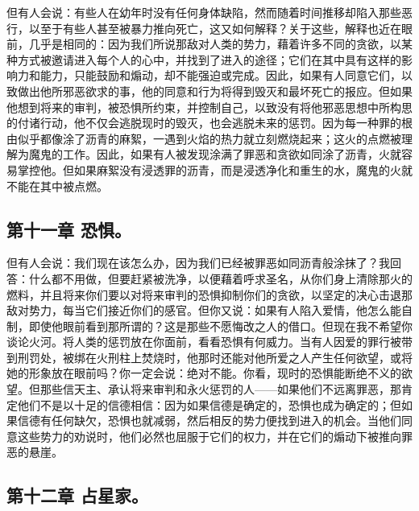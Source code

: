 但有人会说：有些人在幼年时没有任何身体缺陷，然而随着时间推移却陷入那些恶行，以至于有些人甚至被暴力推向死亡，这又如何解释？关于这些，解释也近在眼前，几乎是相同的：因为我们所说那敌对人类的势力，藉着许多不同的贪欲，以某种方式被邀请进入每个人的心中，并找到了进入的途径；它们在其中具有这样的影响力和能力，只能鼓励和煽动，却不能强迫或完成。因此，如果有人同意它们，以致做出他所邪恶欲求的事，他的同意和行为将得到毁灭和最坏死亡的报应。但如果他想到将来的审判，被恐惧所约束，并控制自己，以致没有将他邪恶思想中所构思的付诸行动，他不仅会逃脱现时的毁灭，也会逃脱未来的惩罚。因为每一种罪的根由似乎都像涂了沥青的麻絮，一遇到火焰的热力就立刻燃烧起来；这火的点燃被理解为魔鬼的工作。因此，如果有人被发现涂满了罪恶和贪欲如同涂了沥青，火就容易掌控他。但如果麻絮没有浸透罪的沥青，而是浸透净化和重生的水，魔鬼的火就不能在其中被点燃。\par


\subsection{第十一章 恐惧。}

但有人会说：我们现在该怎么办，因为我们已经被罪恶如同沥青般涂抹了？我回答：什么都不用做，但要赶紧被洗净，以便藉着呼求圣名，从你们身上清除那火的燃料，并且将来你们要以对将来审判的恐惧抑制你们的贪欲，以坚定的决心击退那敌对势力，每当它们接近你们的感官。但你又说：如果有人陷入爱情，他怎么能自制，即使他眼前看到那所谓的？这是那些不愿悔改之人的借口。但现在我不希望你谈论火河。将人类的惩罚放在你面前，看看恐惧有何威力。当有人因爱的罪行被带到刑罚处，被绑在火刑柱上焚烧时，他那时还能对他所爱之人产生任何欲望，或将她的形象放在眼前吗？你一定会说：绝对不能。你看，现时的恐惧能断绝不义的欲望。但那些信天主、承认将来审判和永火惩罚的人——如果他们不远离罪恶，那肯定他们不是以十足的信德相信：因为如果信德是确定的，恐惧也成为确定的；但如果信德有任何缺欠，恐惧也就减弱，然后相反的势力便找到进入的机会。当他们同意这些势力的劝说时，他们必然也屈服于它们的权力，并在它们的煽动下被推向罪恶的悬崖。\par


\subsection{第十二章 占星家。}

